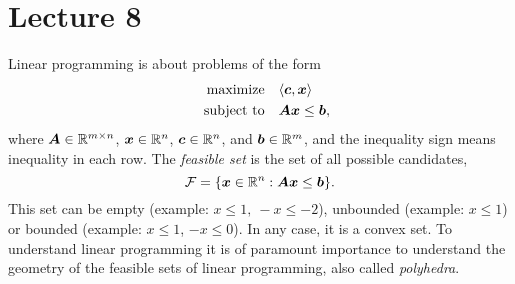 %
%
% 


\chapter*{Lecture 8}
\setcounter{chapter}{8}
\setcounter{section}{0}
\setcounter{equation}{0}
\setcounter{theorem}{0}


Linear programming is about problems of the form
\begin{align*}
 \text{maximize}\quad & \langle {\bm{c}}, {\bm{x}} \rangle\\
 \quad\text{subject to}\quad & \bm{A}\bm{x}\leq \bm{b},
\end{align*}
where $\bm{A}\in \mathbb{R}^{m\times n}$, $\bm{x}\in \mathbb{R}^n$, $\bm{c}\in \mathbb{R}^n$, and $\bm{b}\in \mathbb{R}^m$, and the inequality sign means inequality in each row. The {\em feasible set} is the set of all possible candidates, 
\begin{equation*}
 \mathcal{F} = \{\bm{x}\in \mathbb{R}^n \mathrel{\mathop{:}} \bm{A}\bm{x}\leq \bm{b}\}.
\end{equation*}
This set can be empty (example: $x\leq 1, \ -x\leq -2$), unbounded (example: $x\leq 1$) or bounded (example: $x\leq 1$, $-x\leq 0$). In any case, it is a convex set. To understand linear programming it is of paramount importance to understand the geometry of the feasible sets of linear programming, also called {\em polyhedra}.


